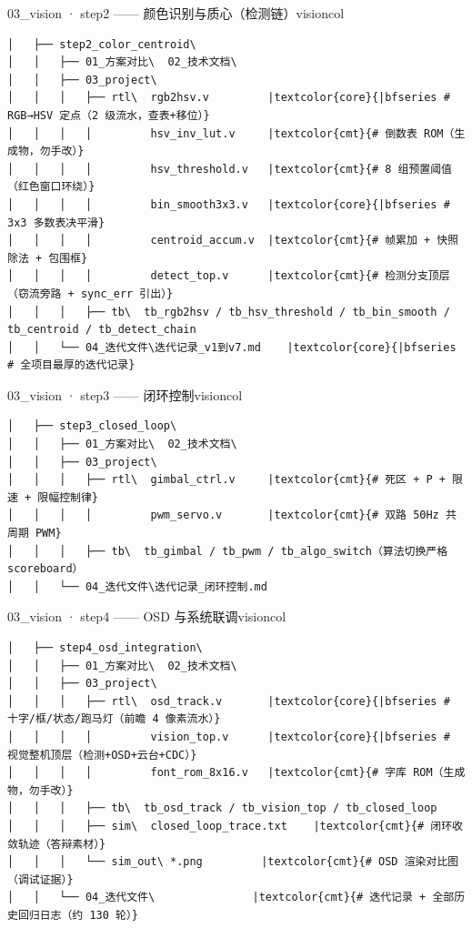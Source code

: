 \documentclass[10pt]{ctexart}
\begin{document}
\vspace{2.2mm}
\begin{sectbox}{03\_vision · step2 —— 颜色识别与质心（检测链）}{visioncol}
\begin{Verbatim}[fontsize=\scriptsize, commandchars=\|\{\}]
│   ├── step2_color_centroid\
│   │   ├── 01_方案对比\  02_技术文档\
│   │   ├── 03_project\
│   │   │   ├── rtl\  rgb2hsv.v         |textcolor{core}{|bfseries # RGB→HSV 定点（2 级流水，查表+移位）}
│   │   │   │         hsv_inv_lut.v     |textcolor{cmt}{# 倒数表 ROM（生成物，勿手改）}
│   │   │   │         hsv_threshold.v   |textcolor{cmt}{# 8 组预置阈值（红色窗口环绕）}
│   │   │   │         bin_smooth3x3.v   |textcolor{core}{|bfseries # 3x3 多数表决平滑}
│   │   │   │         centroid_accum.v  |textcolor{cmt}{# 帧累加 + 快照除法 + 包围框}
│   │   │   │         detect_top.v      |textcolor{cmt}{# 检测分支顶层（窃流旁路 + sync_err 引出）}
│   │   │   ├── tb\  tb_rgb2hsv / tb_hsv_threshold / tb_bin_smooth / tb_centroid / tb_detect_chain
│   │   └── 04_迭代文件\迭代记录_v1到v7.md    |textcolor{core}{|bfseries # 全项目最厚的迭代记录}
\end{Verbatim}
\end{sectbox}
\vspace{2.2mm}
\begin{sectbox}{03\_vision · step3 —— 闭环控制}{visioncol}
\begin{Verbatim}[fontsize=\scriptsize, commandchars=\|\{\}]
│   ├── step3_closed_loop\
│   │   ├── 01_方案对比\  02_技术文档\
│   │   ├── 03_project\
│   │   │   ├── rtl\  gimbal_ctrl.v     |textcolor{cmt}{# 死区 + P + 限速 + 限幅控制律}
│   │   │   │         pwm_servo.v       |textcolor{cmt}{# 双路 50Hz 共周期 PWM}
│   │   │   ├── tb\  tb_gimbal / tb_pwm / tb_algo_switch（算法切换严格 scoreboard）
│   │   └── 04_迭代文件\迭代记录_闭环控制.md
\end{Verbatim}
\end{sectbox}
\vspace{2.2mm}
\begin{sectbox}{03\_vision · step4 —— OSD 与系统联调}{visioncol}
\begin{Verbatim}[fontsize=\scriptsize, commandchars=\|\{\}]
│   ├── step4_osd_integration\
│   │   ├── 01_方案对比\  02_技术文档\
│   │   ├── 03_project\
│   │   │   ├── rtl\  osd_track.v       |textcolor{core}{|bfseries # 十字/框/状态/跑马灯（前瞻 4 像素流水）}
│   │   │   │         vision_top.v      |textcolor{core}{|bfseries # 视觉整机顶层（检测+OSD+云台+CDC）}
│   │   │   │         font_rom_8x16.v   |textcolor{cmt}{# 字库 ROM（生成物，勿手改）}
│   │   │   ├── tb\  tb_osd_track / tb_vision_top / tb_closed_loop
│   │   │   ├── sim\  closed_loop_trace.txt    |textcolor{cmt}{# 闭环收敛轨迹（答辩素材）}
│   │   │   └── sim_out\ *.png         |textcolor{cmt}{# OSD 渲染对比图（调试证据）}
│   │   └── 04_迭代文件\               |textcolor{cmt}{# 迭代记录 + 全部历史回归日志（约 130 轮）}
\end{Verbatim}
\end{sectbox}
\end{document}
